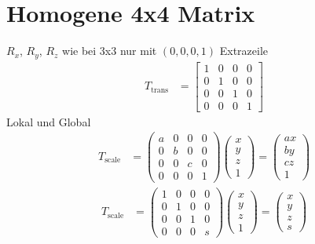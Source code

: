 \section{Homogene 4x4 Matrix}
$R_x$, $R_y$, $R_z$ wie bei 3x3 nur mit $(0,0,0,1)$ Extrazeile
\begin{align}
    T_{\text{trans}} &= \begin{bmatrix}1 & 0 & 0 & 0\\0 & 1 & 0 & 0\\0 & 0 & 1 & 0\\0 & 0 & 0 & 1\end{bmatrix}
\end{align}
Lokal und Global
\begin{align}
    T_{\text{scale}} &= \begin{pmatrix}a & 0 & 0 & 0\\0 & b & 0 & 0\\
    0 & 0 & c & 0\\0 & 0 & 0 & 1\end{pmatrix} \begin{pmatrix}x\\y\\z\\1\end{pmatrix} = \begin{pmatrix}ax\\by\\cz\\1\end{pmatrix}
\end{align}
\begin{align}
    T_{\text{scale}} &= \begin{pmatrix}1 & 0 & 0 & 0\\0 & 1 & 0 & 0\\
    0 & 0 & 1 & 0\\0 & 0 & 0 & s\end{pmatrix} \begin{pmatrix}x\\y\\z\\1\end{pmatrix} = \begin{pmatrix}x\\y\\z\\s\end{pmatrix}
\end{align}
